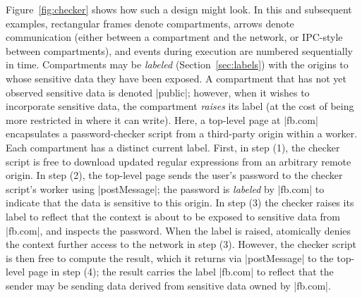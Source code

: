 Figure~\ref{fig:checker} shows how such a design might look. In this
and subsequent examples, rectangular frames denote compartments,
arrows denote communication (either between a compartment and the network,
or IPC-style between compartments), and events during execution are
numbered sequentially in time. Compartments may be \emph{labeled} (Section~\ref{sec:labels}) with the
origins to whose sensitive data they have been exposed. A compartment that
has not yet observed sensitive data is denoted \js|public|; however, when it
wishes to incorporate sensitive data, the compartment \emph{raises} its
label (at the cost of being more restricted in where it can write). Here, a top-level page at
\js|fb.com| encapsulates a password-checker script from a third-party
origin within a worker. Each compartment has a
distinct current label. First, in step (1), the checker script is free
to download updated regular expressions from an arbitrary remote
origin. In step (2), the top-level page sends the user's password to
the checker script's worker using \js|postMessage|; the password is
\emph{labeled} by \js|fb.com| to indicate that the data is sensitive
to this origin.
%
%
In step (3) the checker raises its label to reflect that the context
is about to be exposed to sensitive data from \js|fb.com|, and
inspects the password.
%
When the label is raised, \sys{} atomically denies the context further
access to the network in step (3).
%
However, the checker script is then free to compute the result, which
it returns via \js|postMessage| to the top-level page in step (4); the
result carries the label \js|fb.com| to reflect that the sender may be
sending data derived from sensitive data owned by \js|fb.com|.

